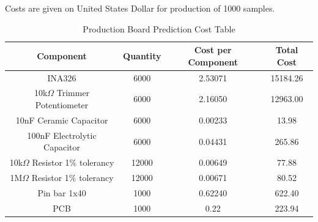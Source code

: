 Costs are given on United States Dollar for production of 1000 samples.\\
\begin{table}[htb]
  \begin{center}
    \ABNTEXreducedfont
    \caption[Production Board Prediction Cost Table]{Production Board Prediction Cost Table}
    \label{Production-cost}
    \begin{tabular}{|c|c|c|c|}
      \hline
    Component & Quantity & Cost per Component & Total Cost \\ \hline
    INA326 & 6000 & 2.53071 & 15184.26\\ \hline
    10k$\Omega$ Trimmer Potentiometer & 6000 & 2.16050 & 12963.00 \\ \hline
    10nF Ceramic Capacitor & 6000 & 0.00233 & 13.98 \\ \hline
    100nF Electrolytic Capacitor & 6000 & 0.04431 & 265.86 \\ \hline
    10k$\Omega$ Resistor 1$\%$ tolerancy & 12000 & 0.00649 & 77.88 \\ \hline
    1M$\Omega$ Resistor 1$\%$ tolerancy & 12000 & 0.00671 & 80.52 \\ \hline
    Pin bar 1x40 & 1000 & 0.62240 & 622.40 \\ \hline
    PCB & 1000 & 0.22 & 223.94 \\ \hline
  \end{tabular}
\end{center}
\end{table}
